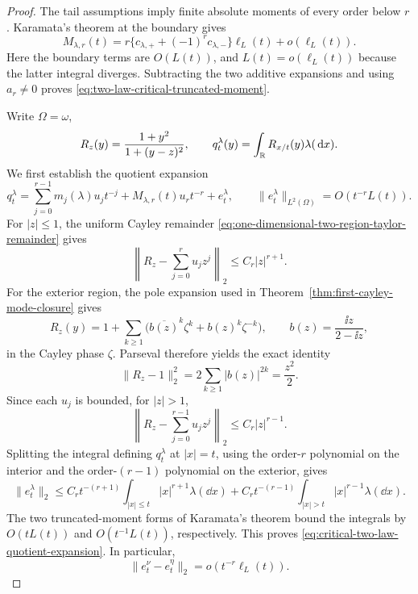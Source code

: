 \begin{proof}
The tail assumptions imply finite absolute moments of every order below
\(r\).  Karamata's theorem at the boundary gives
\[
 M_{\lambda,r}(t)
 =r\{c_{\lambda,+}+(-1)^rc_{\lambda,-}\}\ell_L(t)+o(\ell_L(t)).
\]
Here the boundary terms are \(O(L(t))\), and
\(L(t)=o(\ell_L(t))\) because the latter integral diverges.  Subtracting the
two additive expansions and using \(a_r\ne0\) proves
\eqref{eq:two-law-critical-truncated-moment}.

Write \(\Omega=\omega\),
\[
 R_z(y)=\frac{1+y^2}{1+(y-z)^2},
 \qquad
 q_t^\lambda(y)=\int_{\mathbb{R}} R_{x/t}(y)\lambda(\,\mathrm{d} x).
\]
We first establish the quotient expansion
\begin{equation}\label{eq:critical-two-law-quotient-expansion}
 q_t^\lambda
 =\sum_{j=0}^{r-1}m_j(\lambda)u_jt^{-j}
  +M_{\lambda,r}(t)u_rt^{-r}+e_t^\lambda,
 \qquad
 \|e_t^\lambda\|_{L^2(\Omega)}=O(t^{-r}L(t)).
\end{equation}
For \(|z|\le1\), the uniform Cayley remainder
\eqref{eq:one-dimensional-two-region-taylor-remainder} gives
\[
 \left\|R_z-\sum_{j=0}^ru_jz^j\right\|_2\le C_r|z|^{r+1}.
\]
For the exterior region, the pole expansion used in
Theorem~\ref{thm:first-cayley-mode-closure} gives
\[
 R_z(y)=1+\sum_{k\ge1}
 \bigl(\overline{b(z)}^k\zeta^k+b(z)^k\zeta^{-k}\bigr),
 \qquad b(z)=\frac{\ii z}{2-\ii z},
\]
in the Cayley phase \(\zeta\).  Parseval therefore yields the exact identity
\[
 \|R_z-1\|_2^2
 =2\sum_{k\ge1}|b(z)|^{2k}=\frac{z^2}{2}.
\]
Since each \(u_j\) is bounded, for \(|z|>1\),
\begin{equation}\label{eq:critical-exterior-l2-jet-bound}
 \left\|R_z-\sum_{j=0}^{r-1}u_jz^j\right\|_2
 \le C_r|z|^{r-1}.
\end{equation}
Splitting the integral defining \(q_t^\lambda\) at \(|x|=t\), using the
order-\(r\) polynomial on the interior and the order-\((r-1)\) polynomial
on the exterior, gives
\[
 \|e_t^\lambda\|_2
 \le C_rt^{-(r+1)}
       \int_{|x|\le t}|x|^{r+1}\lambda(\dd x)
   +C_rt^{-(r-1)}
       \int_{|x|>t}|x|^{r-1}\lambda(\dd x).
\]
The two truncated-moment forms of Karamata's theorem bound the integrals by
\(O(tL(t))\) and \(O(t^{-1}L(t))\), respectively.  This proves
\eqref{eq:critical-two-law-quotient-expansion}.  In particular,
\[
 \|e_t^\nu-e_t^\eta\|_2
 =o(t^{-r}\ell_L(t)).
\]


\end{proof}
